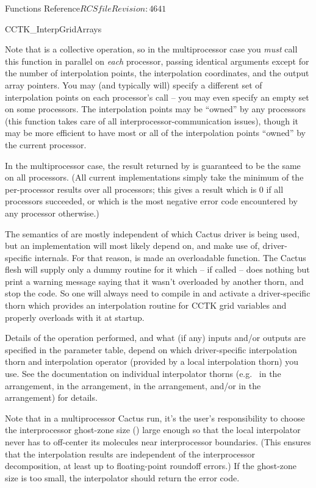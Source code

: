 \begin{cactuspart}{ Functions Reference}{$RCSfile$}{$Revision: 4641 $}
\begin{FunctionDescription}{CCTK\_InterpGridArrays}
\begin{Discussion}
Note that  is a collective operation, so in the
multiprocessor case you {\em must\/} call this function in parallel on
{\em each\/} processor, passing identical arguments except for the number of
interpolation points, the interpolation coordinates, and the output array
pointers.  You may (and typically will) specify a different set of
interpolation points on each processor's call -- you may even specify
an empty set on some processors.  The interpolation points may be
``owned'' by any processors (this function takes care of all
interprocessor-communication issues), though it may be more efficient
to have most or all of the interpolation points ``owned'' by the
current processor.

In the multiprocessor case, the result returned by
 is guaranteed to be the same on all
processors.  (All current implementations simply take the minimum
of the per-processor results over all processors; this gives a
result which is 0 if all processors succeeded, or which is the most
negative error code encountered by any processor otherwise.)

The semantics of  are mostly independent of
which Cactus driver is being used, but an implementation will most likely
depend on, and make use of, driver-specific internals. For that reason,
 is made an overloadable function. The Cactus
flesh will supply only a dummy routine for it which -- if called -- does
nothing but print a warning message saying that it wasn't overloaded by
another thorn, and stop the code. So one will always need to compile in
and activate a driver-specific thorn which provides an interpolation routine
for CCTK grid variables and properly overloads 
with it at startup.

Details of the operation performed, and what (if any) inputs and/or
outputs are specified in the parameter table, depend on which driver-specific
interpolation thorn and interpolation operator (provided by a local
interpolation thorn) you use.  See the documentation on individual interpolator
thorns (e.g.\  in the  arrangement,
 in the  arrangement,
 in the  arrangement, and/or
 in the  arrangement) for details.

Note that in a multiprocessor Cactus run, it's the user's responsibility
to choose the interprocessor ghost-zone size ()
large enough so that the local interpolator never has to off-center
its molecules near interprocessor boundaries.  (This ensures that the
interpolation results are independent of the interprocessor decomposition,
at least up to floating-point roundoff errors.)
If the ghost-zone size is too small, the interpolator should return
the  error code.
\end{Discussion}


\end{FunctionDescription}
\end{cactuspart}
